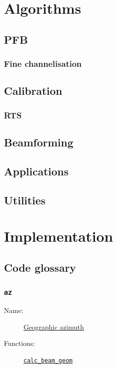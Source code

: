 \documentclass{book}
\begin{document}
\chapter{Algorithms}

\section{PFB}

\subsection{Fine channelisation}

\section{Calibration}

\subsection{RTS}

\section{Beamforming}

\section{Applications}

\section{Utilities}

\chapter{Implementation}

\section{Code glossary}

\subsection{\texttt{az}}
\begin{description}
    \item[Name:] \hyperlink{sec:coordslocalsky}{Geographic azimuth}
    \item[Functions:] \hyperlink{cn:calc_beam_geom}{\texttt{calc\_beam\_geom}}
\end{description}
\end{document}
